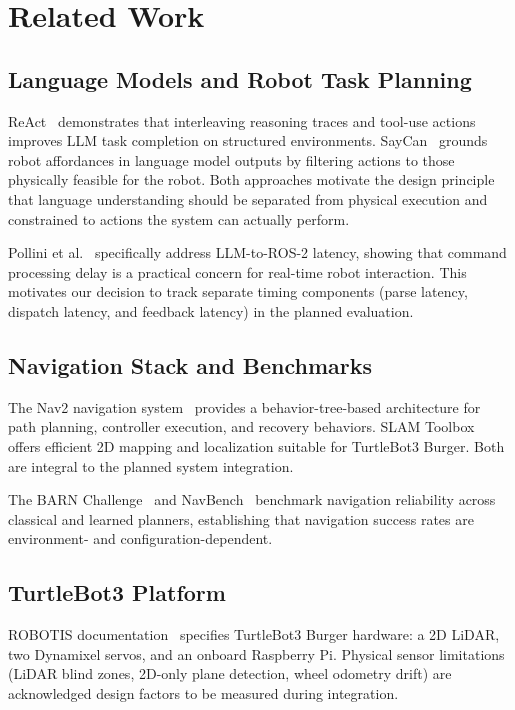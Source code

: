 \documentclass[conference]{IEEEtran}
\begin{document}
\section{Related Work}

\subsection{Language Models and Robot Task Planning}

ReAct~\cite{yao2023react} demonstrates that interleaving reasoning traces and
tool-use actions improves LLM task completion on structured environments.
SayCan~\cite{ahn2022saycan} grounds robot affordances in language model outputs by
filtering actions to those physically feasible for the robot. Both approaches motivate
the design principle that language understanding should be separated from physical
execution and constrained to actions the system can actually perform.

Pollini et al.~\cite{pollini2025latency} specifically address LLM-to-ROS-2 latency,
showing that command processing delay is a practical concern for real-time robot
interaction. This motivates our decision to track separate timing components (parse
latency, dispatch latency, and feedback latency) in the planned evaluation.

\subsection{Navigation Stack and Benchmarks}

The Nav2 navigation system~\cite{macenski2020marathon} provides a behavior-tree-based
architecture for path planning, controller execution, and recovery behaviors.
SLAM Toolbox~\cite{macenski2021slam} offers efficient 2D mapping and localization
suitable for TurtleBot3 Burger. Both are integral to the planned system integration.

The BARN Challenge~\cite{xiao2022barn,xiao2026barn} and NavBench~\cite{elhariry2025navbench}
benchmark navigation reliability across classical and learned planners, establishing
that navigation success rates are environment- and configuration-dependent.

\subsection{TurtleBot3 Platform}

ROBOTIS documentation~\cite{robotis2024tb3} specifies TurtleBot3 Burger hardware:
a 2D LiDAR, two Dynamixel servos, and an onboard Raspberry Pi. Physical sensor
limitations (LiDAR blind zones, 2D-only plane detection, wheel odometry drift) are
acknowledged design factors to be measured during integration.
\end{document}
